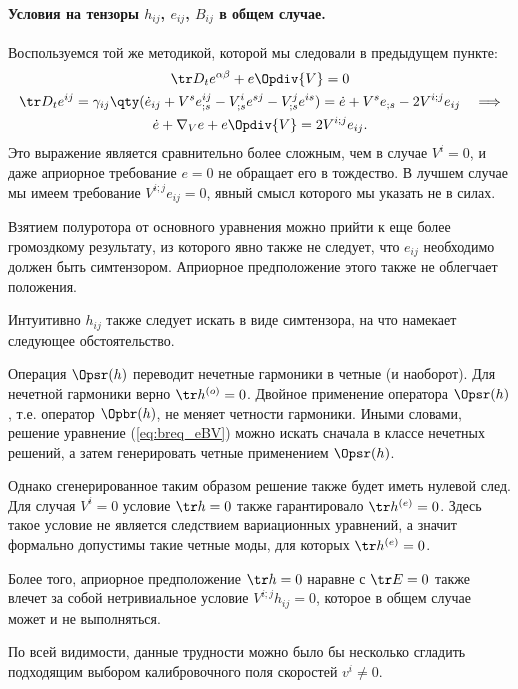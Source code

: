 \documentclass[\docroot/reports/draft/report.tex]{subfiles}
\begin{document}
    \paragraph{Условия на тензоры $h_{ij}$, $e_{ij}$, $B_{ij}$ в общем случае.}

    Воспользуемся той же методикой, которой мы следовали в предыдущем пункте:
    \begin{gather*}
        \tr D_t{e^{\alpha\beta}} + e \Opdiv{V} = 0 \\
        \tr D_t{e^{ij}} = \gamma_{ij} \qty(
            \dot{e}_{ij} + V^s e^{ij}_{;s} - V^i_{;s} e^{sj} - V^j_{;s} e^{is}
        ) = \dot{e} + V^s e_{;s} - 2 V^{i;j} e_{ij} \quad\Longrightarrow\\
        \dot{e} + \nabla_V e + e \Opdiv{V} = 2 V^{i;j} e_{ij} .
    \end{gather*}
    Это выражение является сравнительно более сложным, чем в случае $V^i = 0$, и даже априорное требование $e = 0$ не обращает его в тождество. В лучшем случае мы имеем требование $V^{i;j} e_{ij} = 0$, явный смысл которого мы указать не в силах.

    Взятием полуротора от основного уравнения можно прийти к еще более громоздкому результату, из которого явно также не следует, что $e_{ij}$ необходимо должен быть симтензором. Априорное предположение этого также не облегчает положения.

    Интуитивно $h_{ij}$ также следует искать в виде симтензора, на что намекает следующее обстоятельство.

    Операция $\Opsr(h)$ переводит нечетные гармоники в четные (и наоборот). Для нечетной гармоники верно $\tr h^{(o)} = 0$. Двойное применение оператора $\Opsr(h)$, т.е. оператор $\Opbr(h)$, не меняет четности гармоники. Иными словами, решение уравнение (\ref{eq:breq_eBV}) можно искать сначала в классе нечетных решений, а затем генерировать четные применением $\Opsr(h)$.

    Однако сгенерированное таким образом решение также будет иметь нулевой след. Для случая $V^i = 0$ условие $\tr h = 0$ также гарантировало $\tr h^{(e)} = 0$. Здесь такое условие не является следствием вариационных уравнений, а значит формально допустимы такие четные моды, для которых $\tr h^{(e)} = 0$.

    Более того, априорное предположение $\tr h = 0$ наравне с $\tr E = 0$ также влечет за собой нетривиальное условие $V^{i;j} h_{ij} = 0$, которое в общем случае может и не выполняться.

    По всей видимости, данные трудности можно было бы несколько сгладить подходящим выбором калибровочного поля скоростей $v^i \neq 0$.

\end{document}
